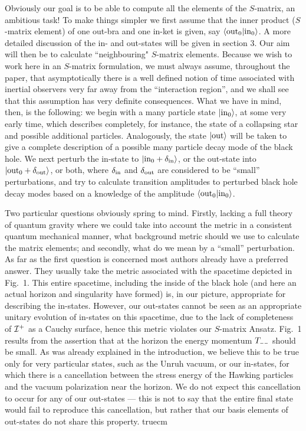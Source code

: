 Obviously our goal is to be able to compute all the elements of the
$S$-matrix, an ambitious task! To make things simpler we first assume
that the inner product ($S$-matrix element) of one out-bra and one
in-ket is given, say $\langle {\rm out}_0|{\rm in}_0\rangle$.  A more
detailed discussion of the in- and out-states will be given in section
3. Our aim will then be to calculate ``neighbouring" $S$-matrix
elements. Because we wish to work here in an $S$-matrix formulation, we
must always assume, throughout the paper, that asymptotically there is
a well defined notion of time associated with inertial observers very
far away from the ``interaction region'', and we shall see that this
assumption has very definite consequences. What we have in mind, then,
is the following: we begin with a many particle state $|{\rm
in}_0\rangle$, at some very early time, which describes completely, for
instance,  the state of a collapsing star and possible additional
particles. Analogously, the state $|{\rm out}\rangle$ will be taken to
give a complete description of a possible many particle decay mode of
the black hole. We next perturb the in-state
to $|{\rm in}_0+\d_{{\rm in}}\rangle$, or the out-state into  $|{\rm
out}_0+\d_{{\rm out}}\rangle$, or both, where $\d_{{\rm in}}$ and
$\d_{\rm out}$ are
considered to be ``small'' perturbations, and try to calculate
transition amplitudes to perturbed black hole decay modes based on a
knowledge of the amplitude $\langle {\rm out}_0|{\rm in}_0\rangle$.

Two particular questions obviously spring to mind. Firstly, lacking a
full theory of quantum gravity where we could take into account the
metric in a consistent quantum mechanical manner, what background
metric should we use to calculate the matrix elements; and secondly,
what do we mean by a ``small'' perturbation. As far as the first
question is concerned most authors already have a preferred answer.
They usually take the metric associated with the spacetime depicted in
Fig.~1.  This entire spacetime, including the inside of the black hole
(and here an actual horizon and singularity have formed) is, in our
picture, appropriate for describing the in-states.  However, our
out-states cannot be seen as an appropriate unitary evolution of
in-states on this spacetime, due to the lack of completeness of $\cal
I^+$ as a Cauchy surface,  hence this metric violates our $S$-matrix
Ansatz. Fig.~1 results from the assertion that at the horizon the
energy momentum $T_{\ss --}$ should be small. As was already explained in
the introduction, we believe this to be true only for very particular
states, such as the Unruh vacuum, or our in-states, for which there is
a cancellation between the stress energy of the Hawking particles and
the vacuum polarization near the horizon. We do not expect this
cancellation to occur for any of our out-states --- this is not to
say that the entire final state would fail to reproduce this
cancellation, but rather that our basis elements of out-states
do not share this property.
\midinsert
{} truecm

